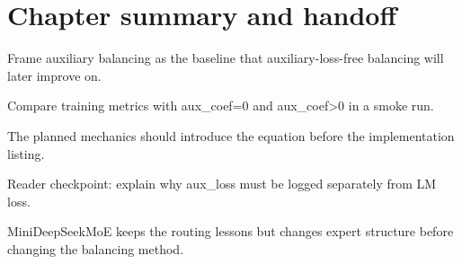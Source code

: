 \section{Chapter summary and handoff}
\label{sec:ch07-chapter-summary-and-handoff}

Frame auxiliary balancing as the baseline that auxiliary-loss-free balancing will later improve on.



Compare training metrics with aux\_coef=0 and aux\_coef>0 in a smoke run.



The planned mechanics should introduce the equation before the implementation listing.





\begin{checkpointbox}
Reader checkpoint: explain why aux\_loss must be logged separately from LM loss.
\end{checkpointbox}

MiniDeepSeekMoE keeps the routing lessons but changes expert structure before changing the balancing method.
